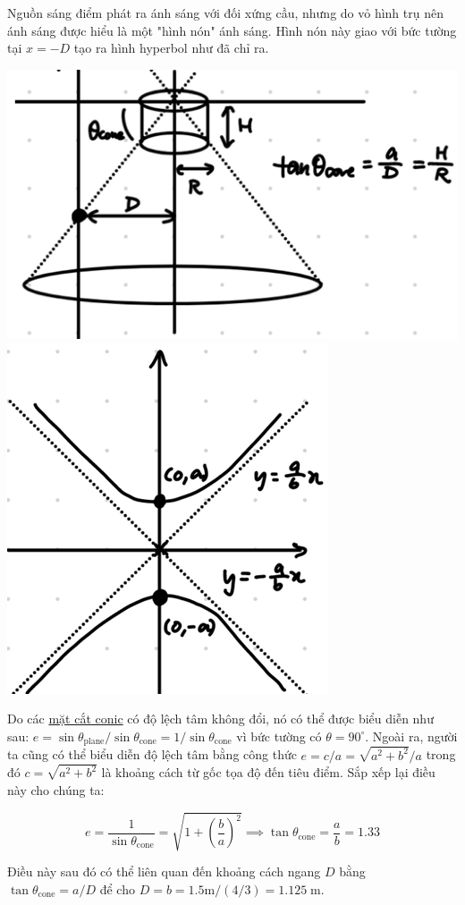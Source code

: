 \begin{solution}
Nguồn sáng điểm phát ra ánh sáng với đối xứng cầu, nhưng do vỏ hình trụ nên ánh sáng được hiểu là một "hình nón" ánh sáng. Hình nón này giao với bức tường tại $x=-D$ tạo ra hình hyperbol như đã chỉ ra.

\begin{center}
    \includegraphics[height=0.35\textwidth]{solutions/figures/lightConeAnswerDiagram.png}
    \hfill
    \includegraphics[height=0.35\textwidth]{solutions/figures/lightConeAnswerGraph.png}
\end{center}

Do các \href{https://www.youtube.com/watch?v=kfWDkVct5mM}{mặt cắt conic} có độ lệch tâm không đổi, nó có thể được biểu diễn như sau: $e = \sin\theta_\text{plane}/\sin\theta_\text{cone} = 1/\sin\theta_\text{cone}$ vì bức tường có $\theta = 90^\circ$. Ngoài ra, người ta cũng có thể biểu diễn độ lệch tâm bằng công thức $e=c/a=\sqrt{a^2+b^2}/a$ trong đó $c=\sqrt{a^2+b^2}$ là khoảng cách từ gốc tọa độ đến tiêu điểm. Sắp xếp lại điều này cho chúng ta:

$$e = \frac{1}{\sin\theta_\text{cone}} = \sqrt{1+\left(\frac{b}{a}\right)^2} \implies \tan\theta_\text{cone} = \frac{a}{b} = 1.33$$

Điều này sau đó có thể liên quan đến khoảng cách ngang $D$ bằng $\tan\theta_\text{cone} = a/D$ để cho $D = b = 1.5\text{m}/(4/3) = \boxed{1.125\;\text{m}}$.
\end{solution}
